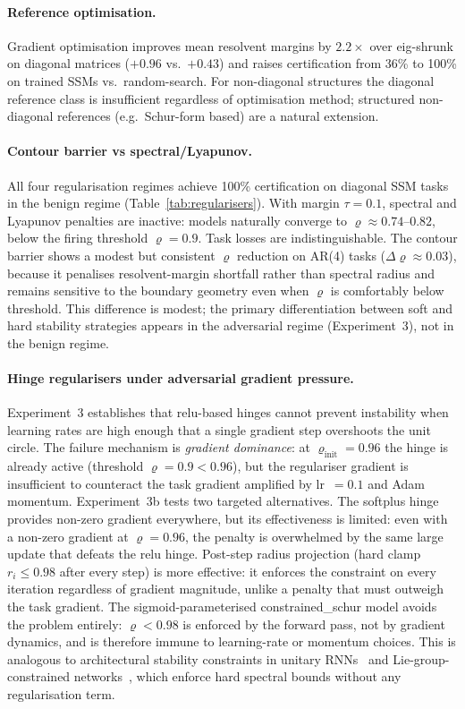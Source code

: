 \documentclass{article}
\theoremstyle{definition}
\begin{document}
\paragraph{Reference optimisation.}
Gradient optimisation improves mean resolvent margins by $2.2\times$
over eig-shrunk on diagonal matrices ($+0.96$ vs.\ $+0.43$) and raises
certification from 36\% to 100\% on trained SSMs vs.\ random-search.
For non-diagonal structures the diagonal reference class is insufficient
regardless of optimisation method; structured non-diagonal references
(e.g.\ Schur-form based) are a natural extension.

\paragraph{Contour barrier vs spectral/Lyapunov.}
All four regularisation regimes achieve 100\% certification on diagonal
SSM tasks in the benign regime (Table~\ref{tab:regularisers}).  With
margin $\tau=0.1$, spectral and Lyapunov penalties are inactive: models
naturally converge to $\varrho\approx0.74$--$0.82$, below the firing
threshold $\varrho=0.9$.  Task losses are indistinguishable.  The contour
barrier shows a modest but consistent $\varrho$ reduction on AR(4) tasks
($\Delta\varrho\approx0.03$), because it penalises resolvent-margin
shortfall rather than spectral radius and remains sensitive to the
boundary geometry even when $\varrho$ is comfortably below threshold.
This difference is modest; the primary differentiation between soft and
hard stability strategies appears in the adversarial regime (Experiment~3),
not in the benign regime.

\paragraph{Hinge regularisers under adversarial gradient pressure.}
Experiment~3 establishes that relu-based hinges cannot prevent
instability when learning rates are high enough that a single gradient
step overshoots the unit circle.  The failure mechanism is
\emph{gradient dominance}: at $\varrho_\mathrm{init}=0.96$ the hinge is
already active (threshold $\varrho=0.9 < 0.96$), but the regulariser
gradient is insufficient to counteract the task gradient amplified by
lr~$=0.1$ and Adam momentum.
Experiment~3b tests two targeted alternatives.  The softplus hinge
provides non-zero gradient everywhere, but its effectiveness is limited:
even with a non-zero gradient at $\varrho=0.96$, the penalty is
overwhelmed by the same large update that defeats the relu hinge.
Post-step radius projection (hard clamp $r_i \leq 0.98$ after every
step) is more effective: it enforces the constraint on every iteration
regardless of gradient magnitude, unlike a penalty that must outweigh
the task gradient.  The sigmoid-parameterised constrained\_schur model
avoids the problem entirely: $\varrho < 0.98$ is enforced by the forward
pass, not by gradient dynamics, and is therefore immune to learning-rate
or momentum choices.  This is analogous to architectural stability
constraints in unitary RNNs~\cite{arjovsky2016unitary} and
Lie-group-constrained networks~\cite{lezcano2019cheap}, which enforce
hard spectral bounds without any regularisation term.
\end{document}
